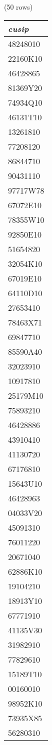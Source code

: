 \noindent (50 rows) \\

\begin{tabular}{l}
\textit{cusip} \\
\hline
48248010 \\
22160K10 \\
46428865 \\
81369Y20 \\
74934Q10 \\
46131T10 \\
13261810 \\
77208120 \\
86844710 \\
90431110 \\
97717W78 \\
67072E10 \\
78355W10 \\
92850E10 \\
51654820 \\
32054K10 \\
67019E10 \\
64110D10 \\
27653410 \\
78463X71 \\
69847710 \\
85590A40 \\
32023910 \\
10917810 \\
25179M10 \\
75893210 \\
46428886 \\
43910410 \\
41130720 \\
67176810 \\
15643U10 \\
46428963 \\
04033V20 \\
45091310 \\
76011220 \\
20671040 \\
62886K10 \\
19104210 \\
18913Y10 \\
67771910 \\
41135V30 \\
31982910 \\
77829610 \\
15189T10 \\
00160010 \\
98952K10 \\
73935X85 \\
56280310 \\
\end{tabular}

